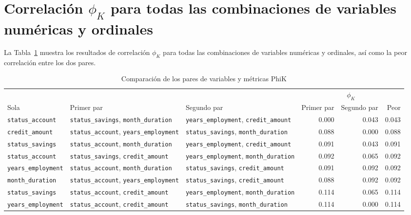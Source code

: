 \documentclass{ieeeaccess}
\begin{document}
\section{Correlación $\phi_{K}$ para todas las combinaciones de variables numéricas y ordinales}
\label{ap:phik_numerical_ordinal}

La Tabla~\ref{tab:phik_numerical_ordinal} muestra los resultados de correlación $\phi_{K}$ para todas las combinaciones de variables numéricas y ordinales, así como la peor correlación entre los dos pares.

\begin{table}[htbp]
  \caption{Comparación de los pares de variables y métricas PhiK}
  \label{tab:phik_numerical_ordinal}
  \centering
  \setlength{\tabcolsep}{4pt}
  \begin{tabular}{@{}lllrrr@{}}
  \toprule
   & & & \multicolumn{3}{c}{$\phi_K$} \\
  \cmidrule(l){4-6}
  Sola & Primer par & Segundo par & Primer par & Segundo par & Peor \\
  \midrule
  \texttt{status\_account} & \texttt{status\_savings}, \texttt{month\_duration} & \texttt{years\_employment}, \texttt{credit\_amount} & 0.000 & 0.043 & 0.043 \\
  \texttt{credit\_amount} & \texttt{status\_account}, \texttt{years\_employment} & \texttt{status\_savings}, \texttt{month\_duration} & 0.088 & 0.000 & 0.088 \\
  \texttt{status\_savings} & \texttt{status\_account}, \texttt{month\_duration} & \texttt{years\_employment}, \texttt{credit\_amount} & 0.091 & 0.043 & 0.091 \\
  \texttt{status\_account} & \texttt{status\_savings}, \texttt{credit\_amount} & \texttt{years\_employment}, \texttt{month\_duration} & 0.092 & 0.065 & 0.092 \\
  \texttt{years\_employment} & \texttt{status\_account}, \texttt{month\_duration} & \texttt{status\_savings}, \texttt{credit\_amount} & 0.091 & 0.092 & 0.092 \\
  \texttt{month\_duration} & \texttt{status\_account}, \texttt{years\_employment} & \texttt{status\_savings}, \texttt{credit\_amount} & 0.088 & 0.092 & 0.092 \\
  \texttt{status\_savings} & \texttt{status\_account}, \texttt{credit\_amount} & \texttt{years\_employment}, \texttt{month\_duration} & 0.114 & 0.065 & 0.114 \\
  \texttt{years\_employment} & \texttt{status\_account}, \texttt{credit\_amount} & \texttt{status\_savings}, \texttt{month\_duration} & 0.114 & 0.000 & 0.114 \\

\end{tabular}
\end{table}
\end{document}
